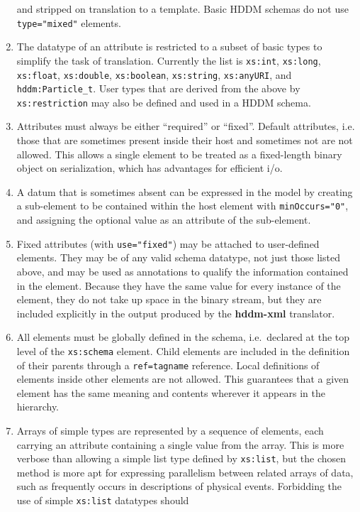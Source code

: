 \documentclass{revtex4}
\begin{document}
\begin{enumerate}
and stripped on translation to a template. Basic HDDM schemas do
not use \texttt{type="mixed"} elements. 
\item  The datatype of an attribute is restricted to a subset of
basic types to simplify the task of translation. Currently the list is
\texttt{xs:int}, \texttt{xs:long}, \texttt{xs:float}, \texttt{xs:double},
\texttt{xs:boolean}, \texttt{xs:string}, \texttt{xs:anyURI}, and
\texttt{hddm:Particle\_t}.  User types that are derived from the
above by \texttt{xs:restriction} may also be defined and used in
a HDDM schema. 
\item  Attributes must always be either ``required'' or ``fixed''.
Default attributes, i.e. those that are sometimes present inside
their host and sometimes not are not allowed. This allows a single
element to be treated as a fixed-length binary object on serialization,
which has advantages for efficient i/o. 
\item  A datum that is sometimes absent can be expressed in the
model by creating a sub-element to be contained within the host
element with \texttt{minOccurs="0"}, and assigning the optional
value as an attribute of the sub-element.
\item  Fixed attributes (with \texttt{use="fixed"}) may be attached
to user-defined elements. They may be of any valid schema datatype,
not just those listed above, and may be used as annotations to 
qualify the information contained in the element. Because they have
the same value for every instance of the element, they do not take
up space in the binary stream, but they are included explicitly
in the output produced by the \textbf{hddm-xml} translator. 
\item  All elements must be globally defined in the schema, i.e.\ 
declared at the top level of the \texttt{xs:schema} element. Child
elements are included in the definition of their parents through
a \texttt{ref=tagname} reference. Local definitions of elements
inside other elements are not allowed. This guarantees that a given
element has the same meaning and contents wherever it appears in
the hierarchy. 
\item  Arrays of simple types are represented by a sequence of
elements, each carrying an attribute containing a single value
from the array. This is more verbose than allowing a simple list
type defined by \texttt{xs:list}, but the chosen method is more
apt for expressing parallelism between related arrays of data,
such as frequently occurs in descriptions of physical events.
Forbidding the use of simple \texttt{xs:list} datatypes should

\end{enumerate}
\end{document}
